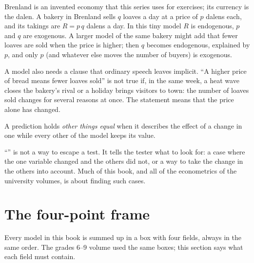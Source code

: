 \begin{example}\label{ex:g10:economic-models:bakery}
Brenland is an invented economy that this series uses for exercises; its currency is the dalen. A
bakery in Brenland sells $q$ loaves a day at a price of $p$ dalens each, and its takings are $R =
p\,q$ dalens a day. In this tiny model $R$ is endogenous, $p$ and $q$ are exogenous. A larger model
of the same bakery might add that fewer loaves are sold when the price is higher; then $q$ becomes
endogenous, explained by $p$, and only $p$ (and whatever else moves the number of buyers) is
exogenous.
\end{example}

A model also needs a clause that ordinary speech leaves implicit. ``A higher price of bread means
fewer loaves sold'' is not true if, in the same week, a heat wave closes the bakery's rival or a
holiday brings visitors to town: the number of loaves sold changes for several reasons at once.
The statement means that the price alone has changed.

\begin{definition}\label{def:g10:economic-models:other-things-equal}
A prediction holds \emph{other things equal} when it describes the effect
of a change in one  while every other  of the model keeps its
value.
\end{definition}

``'' is not a way to escape a test. It tells the tester what to look for: a case
where the one variable changed and the others did not, or a way to take the change in the others
into account. Much of this book, and all of the econometrics of the university volumes, is about
finding such cases.

\section{The four-point frame}\label{sec:g10:economic-models:frame}

Every model in this book is summed up in a box with four fields, always in the same order. The
grades 6--9 volume used the same boxes; this section says what each field must contain.

